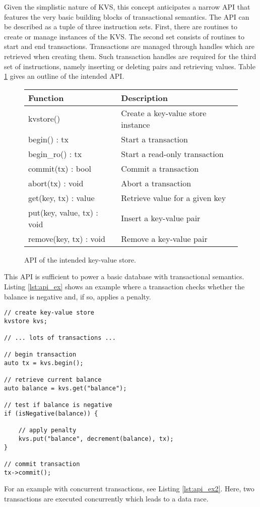 Given the simplistic nature of KVS, this concept anticipates a narrow API that
features the very basic building blocks of transactional semantics. The API can
be described as a tuple of three instruction sets. First, there are routines to
create or manage instances of the KVS. The second set consists of routines to
start and end transactions. Transactions are managed through handles which are
retrieved when creating them. Such transaction handles are required for the
third set of instructions, namely inserting or deleting pairs and retrieving
values. Table \ref{tab:api} gives an outline of the intended API.

\begin{figure}[!h]
    \centering
    \begin{tabular}{|l|l|}
        \hline
        \textbf{Function}          & \textbf{Description} \\
        \hline
        kvstore()                  & Create a key-value store instance \\
        begin() : tx               & Start a transaction \\
        begin\_ro() : tx            & Start a read-only transaction \\
        commit(tx) : bool          & Commit a transaction \\
        abort(tx) : void           & Abort a transaction \\
        get(key, tx) : value       & Retrieve value for a given key \\
        put(key, value, tx) : void & Insert a key-value pair \\
        remove(key, tx) : void     & Remove a key-value pair \\
        \hline
    \end{tabular}
    \caption{API of the intended key-value store.}
    \label{tab:api}
\end{figure}

This API is sufficient to power a basic database with transactional semantics.
Listing \ref{lst:api_ex} shows an example where a transaction checks whether the
balance is negative and, if so, applies a penalty.

\begin{lstlisting}
// create key-value store
kvstore kvs;

// ... lots of transactions ...

// begin transaction
auto tx = kvs.begin();

// retrieve current balance
auto balance = kvs.get("balance");

// test if balance is negative
if (isNegative(balance)) {

	// apply penalty
	kvs.put("balance", decrement(balance), tx);
}

// commit transaction
tx->commit();
\end{lstlisting}\label{lst:api_ex}

For an example with concurrent transactions, see Listing \ref{lst:api_ex2}.
Here, two transactions are executed concurrently which leads to a data race.

